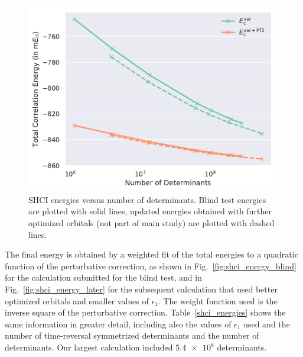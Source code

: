 \documentclass[journal=jcp,manuscript=suppinfo]{achemso}
\begin{document}
%
\begin{figure}[ht!]
\begin{center}
\includegraphics[scale=0.75]{figures/shci/shci.pdf}
\caption{SHCI energies versus number of determinants.  Blind test energies are plotted with solid lines, updated energies obtained with further optimized orbitals (not part of main study) are plotted with dashed lines.}
\label{shci_SI_fig}
\end{center}
\vspace{-0.6cm}
\end{figure}
%
The final energy is obtained by a weighted fit of the total energies to a quadratic function of the perturbative correction, as shown in Fig.~\ref{fig:shci_energy_blind} for the calculation submitted for the blind test, and in Fig.~\ref{fig:shci_energy_later} for the subsequent calculation that used better optimized orbitals and smaller values of $\epsilon_1$. The weight function used is the inverse square of the perturbative correction. Table~\ref{shci_energies} shows the same information in greater detail, including also the values of $\epsilon_1$ used
and the number of time-reversal symmetrized determinants and the number of determinants. Our largest calculation included $\num{5.4e8}$ determinants.\\
\end{document}
